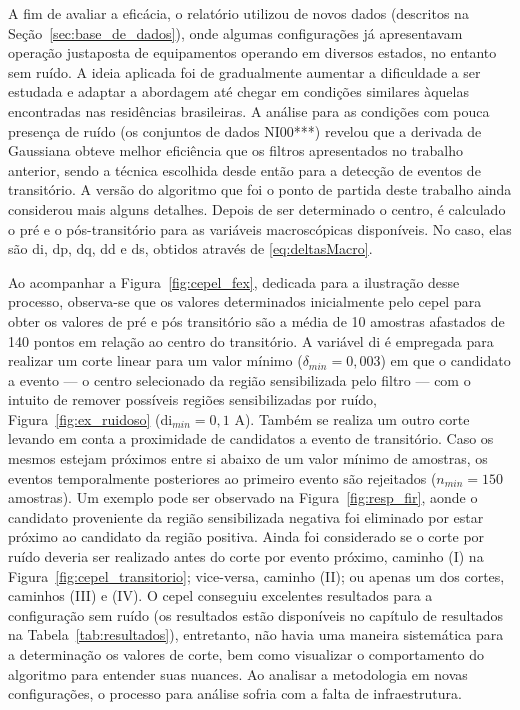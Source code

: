 \FloatBarrier

A fim de avaliar a eficácia, o relatório utilizou de novos dados
(descritos na Seção~\ref{sec:base_de_dados}), onde
algumas configurações já apresentavam operação justaposta de equipamentos
operando em diversos estados, no entanto sem ruído. A ideia aplicada
foi de gradualmente aumentar a dificuldade a ser estudada e adaptar a
abordagem até chegar em condições similares àquelas encontradas nas
residências brasileiras. A análise para as condições com pouca
presença de ruído (os conjuntos de dados NI00***) revelou
que a derivada de Gaussiana obteve melhor eficiência que os filtros
apresentados no trabalho anterior, sendo a técnica escolhida desde
então para a detecção de eventos de transitório.  A versão do
algoritmo que foi o ponto de partida deste trabalho ainda considerou
mais alguns detalhes. Depois de ser determinado o centro, é calculado
o pré e o pós-transitório para as variáveis macroscópicas disponíveis.
No caso, elas são \acf{di}, \acf{dp}, \acf{dq}, \acf{dd} e \acf{ds},
obtidos através de \ref{eq:deltasMacro}.

Ao acompanhar a Figura~\ref{fig:cepel_fex}, dedicada para a ilustração
desse processo, observa-se que os valores determinados inicialmente
pelo \gls{cepel} para obter os valores de pré e pós transitório são a
média de 10 amostras afastados de 140 pontos em relação ao centro do
transitório. A variável \acs{di} é empregada para realizar um corte
linear para um valor mínimo ($\delta_{min} = 0,003$) em que o
candidato a evento --- o centro selecionado da região sensibilizada
pelo filtro --- com o intuito de remover possíveis regiões
sensibilizadas por ruído, Figura~\ref{fig:ex_ruidoso} (\acs{di}$_{min}
= 0,1$ A). Também se realiza um outro corte levando em conta a
proximidade de candidatos a evento de transitório. Caso os mesmos
estejam próximos entre si abaixo de um valor mínimo de amostras, os
eventos temporalmente posteriores ao primeiro evento são rejeitados
($n_{min} = 150$ amostras). Um exemplo pode ser observado na
Figura~\ref{fig:resp_fir}, aonde o candidato proveniente da região
sensibilizada negativa foi eliminado por estar próximo ao candidato da
região positiva. Ainda foi considerado se o corte por ruído deveria
ser realizado antes do corte por evento próximo, caminho (I) na
Figura~\ref{fig:cepel_transitorio}; vice-versa, caminho (II); ou
apenas um dos cortes, caminhos (III) e (IV). O \gls{cepel} conseguiu
excelentes resultados para a configuração sem ruído (os resultados
estão disponíveis no capítulo de resultados na
Tabela~\ref{tab:resultados}), entretanto, não havia uma maneira
sistemática para a determinação os valores de corte, bem como
visualizar o comportamento do algoritmo para entender suas nuances. Ao
analisar a metodologia em novas configurações, o processo para análise
sofria com a falta de infraestrutura.

